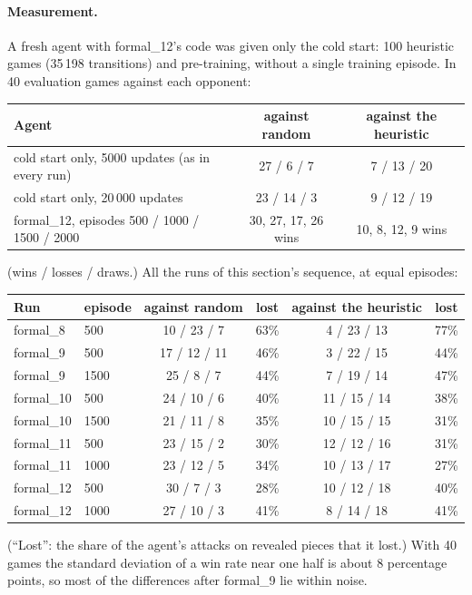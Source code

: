 \paragraph{Measurement.} A fresh agent with formal\_12's code was given only the cold start: 100
heuristic games (35\,198 transitions) and pre-training, without a single training episode. In 40
evaluation games against each opponent:
\begin{center}
\small
\begin{tabular}{lcc}
\toprule
Agent & against random & against the heuristic \\
\midrule
cold start only, 5000 updates (as in every run) & 27 / 6 / 7 & 7 / 13 / 20 \\
cold start only, 20\,000 updates & 23 / 14 / 3 & 9 / 12 / 19 \\
formal\_12, episodes 500 / 1000 / 1500 / 2000 & 30, 27, 17, 26 wins & 10, 8, 12, 9 wins \\
\bottomrule
\end{tabular}
\end{center}
(wins / losses / draws.) All the runs of this section's sequence, at equal episodes:
\begin{center}
\small
\begin{tabular}{llcccc}
\toprule
Run & episode & against random & lost & against the heuristic & lost \\
\midrule
formal\_8  & 500  & 10 / 23 / 7  & 63\% & 4 / 23 / 13  & 77\% \\
formal\_9  & 500  & 17 / 12 / 11 & 46\% & 3 / 22 / 15  & 44\% \\
formal\_9  & 1500 & 25 / 8 / 7   & 44\% & 7 / 19 / 14  & 47\% \\
formal\_10 & 500  & 24 / 10 / 6  & 40\% & 11 / 15 / 14 & 38\% \\
formal\_10 & 1500 & 21 / 11 / 8  & 35\% & 10 / 15 / 15 & 31\% \\
formal\_11 & 500  & 23 / 15 / 2  & 30\% & 12 / 12 / 16 & 31\% \\
formal\_11 & 1000 & 23 / 12 / 5  & 34\% & 10 / 13 / 17 & 27\% \\
formal\_12 & 500  & 30 / 7 / 3   & 28\% & 10 / 12 / 18 & 40\% \\
formal\_12 & 1000 & 27 / 10 / 3  & 41\% & 8 / 14 / 18  & 41\% \\
\bottomrule
\end{tabular}
\end{center}
(``Lost'': the share of the agent's attacks on revealed pieces that it lost.) With 40 games the
standard deviation of a win rate near one half is about 8 percentage points, so most of the
differences after formal\_9 lie within noise.

